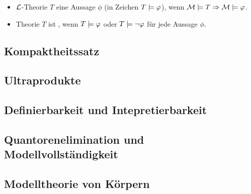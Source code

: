 \begin{definition}
	\begin{itemize}
		\item $\mathcal L$-Theorie $T$  eine Aussage $\phi$ (in Zeichen $T \models \varphi$), wenn $\mathcal M \models T \Rightarrow \mathcal M \models \varphi$.
		\item Theorie $T$ ist , wenn $T \models \varphi$ oder $T \models \neg \varphi$ für jede Aussage $\phi$.
	\end{itemize}
\end{definition}

\subsection{Kompaktheitssatz}

\subsection{Ultraprodukte}

\subsection{Definierbarkeit und Intepretierbarkeit}

\subsection{Quantorenelimination und Modellvollständigkeit}

\subsection{Modelltheorie von Körpern}